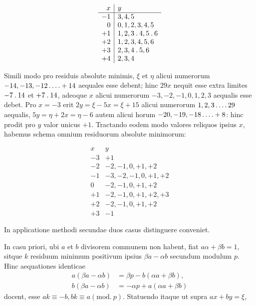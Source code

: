 %
\[
\begin{array}{r|l}
x&y\\\hline
-1&3,4,5\\
0&0,1,2,3,4,5\\
+1&1,2,3\mathbin{.}4,5\mathbin{.}6\\
+2&1,2,3,4,5,6\\
+3&2,3,4\mathbin{.}5,6\\
+4&2,3,4
\end{array}
\]

Simili modo pro residuis absolute minimis, $\xi$ et $\eta$ alicui numerorum $-14,-13,-12\mathinner{.\,.\,.\,.}+14$ aequales esse debent; hinc $29x$ nequit esse extra limites $-7\mathbin{.}14$ et $+7\mathbin{.}14$, adeoque $x$ alicui numerorum $-3,-2,-1,0,1,2,3$ aequalis esse debet. Pro $x=-3$ erit $2y=\xi-5x=\xi+15$ alicui numerorum $1,2,3\mathinner{.\,.\,.\,.}29$ aequalis, $5y=\eta+2x=\eta-6$ autem alicui horum $-20,-19,-18\mathinner{.\,.\,.\,.}+8$: hinc prodit pro $y$ valor unicus $+1$. Tractando eodem modo valores reliquos ipsius $x$, habemus schema omnium residuorum absolute minimorum:

\[
\begin{array}{r|l}
x&y\\\hline
-3&+1\\
-2&-2,-1,0,+1,+2\\
-1&-3,-2,-1,0,+1,+2\\
0&-2,-1,0,+1,+2\\
+1&-2,-1,0,+1,+2,+3\\
+2&-2,-1,0,+1,+2\\
+3&-1
\end{array}
\]

In applicatione methodi secundae duos casus distinguere conveniet.

In casu priori, ubi $a$ et $b$ divisorem communem non habent, fiat $a\alpha+\beta b=1$, sitque $k$ residuum minimum positivum ipsius $\beta a-\alpha b$ secundum modulum $p$. Hinc aequationes identicae
\[
\begin{aligned}
a(\beta a-\alpha b)&=\beta p-b(\alpha a+\beta b),\\
b(\beta a-\alpha b)&=-\alpha p+a(\alpha a+\beta b)
\end{aligned}
\]
docent, esse $ak\equiv-b,bk\equiv a(\mathrm{mod.}\ p)$. Statuendo itaque ut supra $ax+by=\xi$,
